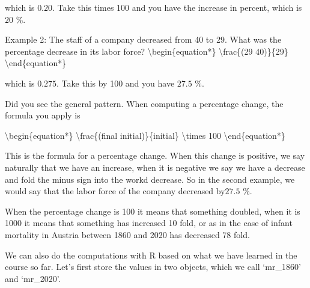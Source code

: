 \documentclass[letterpaper,10pt,english]{jupyterBook}
\begin{document}
\sphinxAtStartPar
which is \(0.20\). Take this times 100 and you have the increase in percent, which is \(20\) \%.

\sphinxAtStartPar
Example 2: The staff of a company decreased from 40 to 29. What was the percentage decrease in its labor force?
\textbackslash{}begin\{equation*\}
\textbackslash{}frac\{(29 \sphinxhyphen{} 40)\}\{29\}
\textbackslash{}end\{equation*\}

\sphinxAtStartPar
which is \(0.275\). Take this by 100 and you have  \(27.5\) \%.

\sphinxAtStartPar
Did you see the general pattern. When computing a percentage change, the formula you apply is

\sphinxAtStartPar
\textbackslash{}begin\{equation*\}
\textbackslash{}frac\{(final \sphinxhyphen{} initial)\}\{initial\} \textbackslash{}times 100
\textbackslash{}end\{equation*\}

\sphinxAtStartPar
This is the formula for a percentage change. When this change is positive, we say naturally that we have an increase, when it is negative we say we have a decrease and fold the minus sign into the workd decrease. So in the second example, we would say that the labor force of the company decreased by\(27.5\) \%.

\sphinxAtStartPar
When the percentage change is 100 it means that something doubled, when it is 1000 it means that something has increased 10 fold, or as in the case of infant mortality in Austria between 1860 and 2020 has decreased 78 fold.

\sphinxAtStartPar
We can also do the computations with R based on what we have learned in the course so far. Let’s first store the values in two objects, which we call ‘mr\_1860’ and ‘mr\_2020’.
\end{document}
